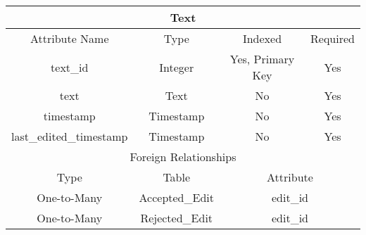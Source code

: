 \documentclass[12pt,letterpaper]{article}
\begin{document}
\vspace{.4cm}
\begin{center}
\label{Text}
\begin{tabular}{|c|c|c|c|}
\hline
\multicolumn{4}{|c|}{Text} \\ \hline
Attribute Name & Type & Indexed & Required \\ \hline
text\_id & Integer & Yes, Primary Key & Yes \\ \hline
text & Text & No & Yes \\ \hline
timestamp & Timestamp & No & Yes \\ \hline
last\_edited\_timestamp & Timestamp & No & Yes \\ \hline
\multicolumn{4}{|c|}{Foreign Relationships} \\ \hline
Type & Table & \multicolumn{2}{c|}{Attribute} \\ \hline
One-to-Many & Accepted\_Edit & \multicolumn{2}{c|}{edit\_id} \\ \hline %
One-to-Many & Rejected\_Edit & \multicolumn{2}{c|}{edit\_id} \\ \hline %
\end{tabular}
\end{center}
\end{document}
